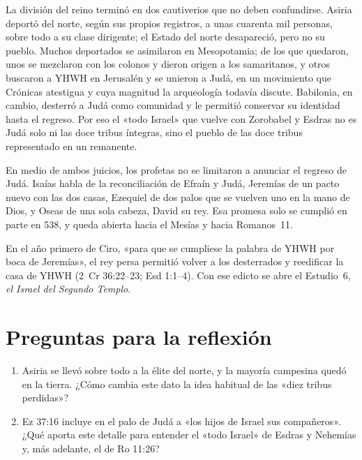 \documentclass[11pt,letterpaper]{article}
\begin{document}
La división del reino terminó en dos cautiverios que no deben confundirse. Asiria deportó del norte, según sus propios registros, a unas cuarenta mil personas, sobre todo a su clase dirigente; el Estado del norte desapareció, pero no su pueblo. Muchos deportados se asimilaron en Mesopotamia; de los que quedaron, unos se mezclaron con los colonos y dieron origen a los samaritanos, y otros buscaron a YHWH en Jerusalén y se unieron a Judá, en un movimiento que Crónicas atestigua y cuya magnitud la arqueología todavía discute. Babilonia, en cambio, desterró a Judá como comunidad y le permitió conservar su identidad hasta el regreso. Por eso el «todo Israel» que vuelve con Zorobabel y Esdras no es Judá solo ni las doce tribus íntegras, sino el pueblo de las doce tribus representado en un remanente.

En medio de ambos juicios, los profetas no se limitaron a anunciar el regreso de Judá. Isaías habla de la reconciliación de Efraín y Judá, Jeremías de un pacto nuevo con las dos casas, Ezequiel de dos palos que se vuelven uno en la mano de Dios, y Oseas de una sola cabeza, David su rey. Esa promesa solo se cumplió en parte en 538, y queda abierta hacia el Mesías y hacia Romanos~11.

En el año primero de Ciro, «para que se cumpliese la palabra de YHWH por boca de Jeremías», el rey persa permitió volver a los desterrados y reedificar la casa de YHWH (2~Cr 36:22--23; Esd 1:1--4). Con ese edicto se abre el Estudio~6, \emph{el Israel del Segundo Templo}.

\section*{Preguntas para la reflexión}
\begin{enumerate}
\item Asiria se llevó sobre todo a la élite del norte, y la mayoría campesina quedó en la tierra. ¿Cómo cambia este dato la idea habitual de las «diez tribus perdidas»?
\item Ez 37:16 incluye en el palo de Judá a «los hijos de Israel sus compañeros». ¿Qué aporta este detalle para entender el «todo Israel» de Esdras y Nehemías y, más adelante, el de Ro 11:26?
\end{enumerate}
\end{document}
